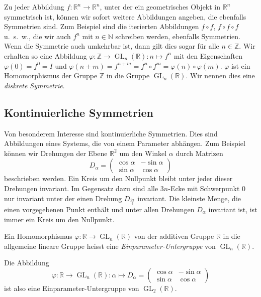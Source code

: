 Zu jeder Abbildung $f\colon\mathbb{R}^n\to\mathbb{R}^n$, unter der 
ein geometrisches Objekt in $\mathbb{R}^n$ symmetrisch ist, können wir
sofort weitere Abbildungen angeben, die ebenfalls Symmetrien sind.
Zum Beispiel sind die iterierten Abbildungen $f\circ f$, $f\circ f\circ f$
u.~s.~w., die wir auch $f^n$ mit $n\in\mathbb{N}$ schreiben werden,
ebenfalls Symmetrien.
Wenn die Symmetrie auch umkehrbar ist, dann gilt dies sogar für alle
$n\in\mathbb{Z}$.
Wir erhalten so eine Abbildung
$\varphi\colon \mathbb{Z}\to \operatorname{GL}_n(\mathbb{R}):n\mapsto f^n$
mit den Eigenschaften $\varphi(0)=f^0 = I$ und
$\varphi(n+m)=f^{n+m}=f^n\circ f^m = \varphi(n)\circ\varphi(m)$.
$\varphi$ ist ein Homomorphismus der Gruppe $\mathbb{Z}$ in die Gruppe
$\operatorname{GL}_n(\mathbb{R})$.
Wir nennen dies eine {\em diskrete Symmetrie}.

\subsection{Kontinuierliche Symmetrien
\label{buch:subsection:kontinuierliche-symmetrien}}
Von besonderem Interesse sind kontinuierliche Symmetrien.
Dies sind Abbildungen eines Systems, die von einem Parameter
abhängen.
Zum Beispiel können wir Drehungen der Ebene $\mathbb{R}^2$ um den
Winkel $\alpha$ durch Matrizen 
\[
D_{\alpha}
=
\begin{pmatrix}
\cos\alpha&-\sin\alpha\\
\sin\alpha& \cos\alpha
\end{pmatrix}
\]
beschrieben werden.
Ein Kreis um den Nullpunkt bleibt unter jeder dieser Drehungen invariant.
Im Gegensatz dazu sind alle $3n$-Ecke mit Schwerpunkt $0$ nur invariant
unter der einen Drehung $D_{\frac{2\pi}3}$ invariant.
Die kleinste Menge, die einen vorgegebenen Punkt enthält und unter
allen Drehungen $D_\alpha$ invariant ist, ist immer ein Kreis um
den Nullpunkt.

\begin{definition}
Ein Homomorphismus $\varphi\colon\mathbb{R}\to\operatorname{GL}_n(\mathbb{R})$
von der additiven Gruppe $\mathbb{R}$ in die allgemeine lineare Gruppe
heisst eine {\em Einparameter-Untergruppe} von
$\operatorname{GL}_n(\mathbb{R})$.
\end{definition}

Die Abbildung 
\[
\varphi
\colon
\mathbb{R}\to\operatorname{GL}_n(\mathbb{R})
:
\alpha \mapsto
D_{\alpha}
=
\begin{pmatrix}
\cos\alpha&-\sin\alpha\\
\sin\alpha& \cos\alpha
\end{pmatrix}
\]
ist also eine Einparameter-Untergruppe von $\operatorname{GL}_2(\mathbb{R})$.

